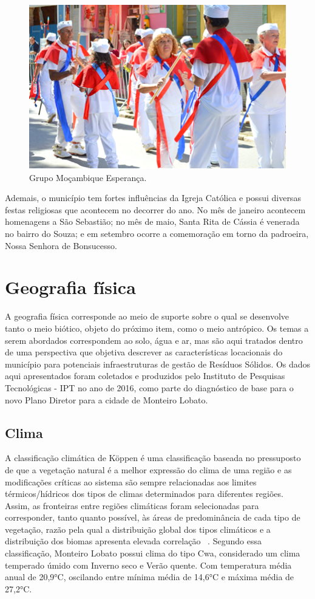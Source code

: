  \begin{figure}[h!]
	\centering
	\includegraphics[width=0.85\linewidth]{produtos/proddois/image25}
	\caption{Grupo Moçambique Esperança.}
	\label{fig:image25}
\end{figure}

Ademais, o município tem fortes influências da Igreja Católica e possui diversas festas religiosas que acontecem no decorrer do ano. No mês de janeiro acontecem homenagens a São Sebastião; no mês de maio, Santa Rita de Cássia é venerada no bairro do Souza; e em setembro ocorre a comemoração em torno da padroeira, Nossa Senhora de Bonsucesso. 

\section{Geografia física}

A geografia física corresponde ao meio de suporte sobre o qual se desenvolve tanto o meio biótico, objeto do próximo item, como o meio antrópico. Os temas a serem abordados correspondem ao solo, água e ar, mas são aqui tratados dentro de uma perspectiva que objetiva descrever as características locacionais do município para potenciais infraestruturas de gestão de Resíduos Sólidos. Os dados aqui apresentados foram coletados e produzidos pelo Instituto de Pesquisas Tecnológicas - IPT no ano de 2016, como parte do diagnóstico de base para o novo Plano Diretor para a cidade de Monteiro Lobato.

\subsection{Clima}

A classificação climática de Köppen é uma classificação baseada no pressuposto de que a vegetação natural é a melhor expressão do clima de uma região e as modificações críticas ao sistema são sempre relacionadas aos limites térmicos/hídricos dos tipos de climas determinados para diferentes regiões. Assim, as fronteiras entre regiões climáticas foram selecionadas para corresponder, tanto quanto possível, às áreas de predominância de cada tipo de vegetação, razão pela qual a distribuição global dos tipos climáticos e a distribuição dos biomas apresenta elevada correlação ~\cite{Rolim2007}. Segundo essa classificação, Monteiro Lobato possui clima do tipo Cwa, considerado um clima temperado úmido com Inverno seco e Verão quente. Com temperatura média anual de 20,9°C, oscilando entre mínima média de 14,6°C e máxima média de 27,2°C.

